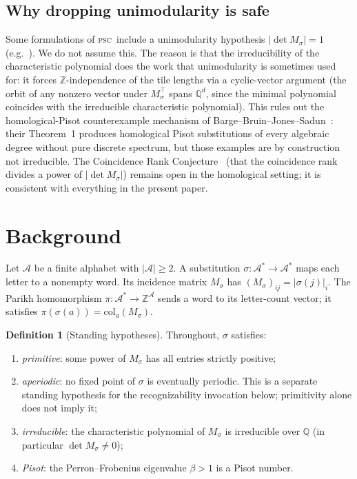 \documentclass[11pt]{article}
\theoremstyle{plain}
\theoremstyle{definition}
\newtheorem{definition}[theorem]{Definition}
\theoremstyle{remark}
\newcommand{\PSC}{\textsc{psc}}
\newcommand{\PDS}{pure discrete spectrum}
\newcommand{\Z}{\mathbb{Z}}
\newcommand{\Q}{\mathbb{Q}}
\newcommand{\A}{\mathcal{A}}
\begin{document}
\subsection{Why dropping unimodularity is safe}\label{sec:nonunimodular}

Some formulations of \PSC\ include a unimodularity hypothesis $|\det M_\sigma|=1$ (e.g.~\cite{BBJS}). We do not assume this. The reason is that the irreducibility of the characteristic polynomial does the work that unimodularity is sometimes used for: it forces $\Z$-independence of the tile lengths via a cyclic-vector argument (the orbit of any nonzero vector under $M_\sigma^\top$ spans $\Q^d$, since the minimal polynomial coincides with the irreducible characteristic polynomial). This rules out the homological-Pisot counterexample mechanism of Barge--Bruin--Jones--Sadun~\cite{BBJS}: their Theorem~1 produces homological Pisot substitutions of every algebraic degree without \PDS, but those examples are by construction not irreducible. The Coincidence Rank Conjecture~\cite{BBJS} (that the coincidence rank divides a power of $|\det M_\sigma|$) remains open in the homological setting; it is consistent with everything in the present paper.

\section{Background}\label{sec:background}

Let $\A$ be a finite alphabet with $|\A|\ge 2$. A substitution $\sigma:\A^*\to\A^*$ maps each letter to a nonempty word. Its incidence matrix $M_\sigma$ has $(M_\sigma)_{ij}=|\sigma(j)|_i$. The Parikh homomorphism $\pi:\A^*\to\Z^\A$ sends a word to its letter-count vector; it satisfies $\pi(\sigma(a))=\mathrm{col}_a(M_\sigma)$.

\begin{definition}[Standing hypotheses]\label{def:standing}
Throughout, $\sigma$ satisfies:
\begin{enumerate}[label=(\roman*)]
\item \emph{primitive}: some power of $M_\sigma$ has all entries strictly positive;
\item \emph{aperiodic}: no fixed point of $\sigma$ is eventually periodic. This is a separate standing hypothesis for the recognizability invocation below; primitivity alone does not imply it;
\item \emph{irreducible}: the characteristic polynomial of $M_\sigma$ is irreducible over $\Q$ (in particular $\det M_\sigma\ne 0$);
\item \emph{Pisot}: the Perron--Frobenius eigenvalue $\beta>1$ is a Pisot number.
\end{enumerate}
\end{definition}
\end{document}
